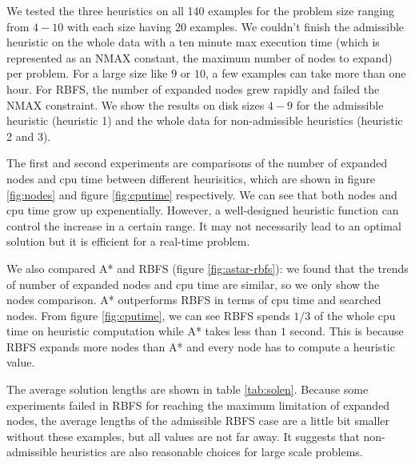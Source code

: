 We tested the three heuristics on all 140 examples for the problem size ranging from $4-10$ with each size having $20$ examples. We couldn't finish the admissible heuristic on the whole data with a ten minute max execution time (which is represented as an NMAX constant, the maximum number of nodes to expand)  per problem. For a large size like $9$ or $10$, a few examples can take more than one hour. For RBFS, the number of expanded nodes grew rapidly and failed the NMAX constraint. We show the results on disk sizes $4-9$ for the admissible heuristic (heuristic 1) and the whole data for non-admissible heuristics (heuristic 2 and 3). 

The first and second experiments are comparisons of the number of expanded nodes and cpu time between different heurisitics, which are shown in figure \ref{fig:nodes} and figure \ref{fig:cputime} respectively. We can see that both nodes and cpu time grow up expenentially. However, a well-designed heuristic function can control the increase in a certain range. It may not necessarily lead to an optimal solution but it is efficient for a real-time problem. 

We also compared A* and RBFS (figure \ref{fig:astar-rbfs}): we found that the trends of number of expanded nodes and cpu time are similar, so we only show the nodes comparison. A* outperforms RBFS in terms of cpu time and searched nodes. From figure \ref{fig:cputime}, we can see RBFS spends $1/3$ of the whole cpu time on heuristic computation while A* takes less than $1$ second. This is because RBFS expands more nodes than A* and every node has to compute a heuristic value.

The average solution lengths are shown in table \ref{tab:solen}. Because some experiments failed in RBFS for reaching the maximum limitation of expanded nodes, the average lengths of the admissible RBFS case are a little bit smaller without these examples, but all values are not far away. It suggests that non-admissible heuristics are also reasonable choices for large scale problems.

